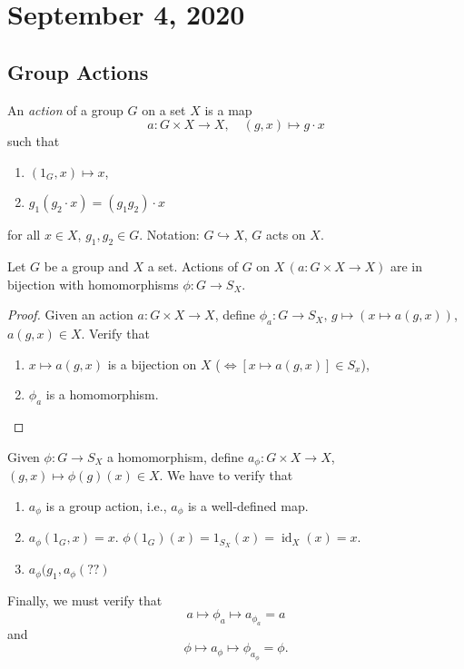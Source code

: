 \section{September 4, 2020}
\subsection{Group Actions}
\begin{definition}
    An \emph{action} of a group $G$ on a set $X$ is a map \[
        a \colon G \times X \to X, \quad (g,x) \mapsto g\cdot x
    \]
    such that 
    \begin{enumerate}
        \item $(1_G,x) \mapsto x$,
        \item $g_1(g_2\cdot x)=(g_1g_2)\cdot x$
    \end{enumerate}
    for all $x\in X$, $g_1,g_2\in G$. Notation: $G \hookrightarrow X$, $G$ acts on $X$.
\end{definition}
\begin{prop}
    Let $G$ be a group and $X$ a set. Actions of $G$ on $X \,(a \colon G\times X \to X)$ are in bijection with homomorphisms $\phi \colon G \to S_X$.
\end{prop}
\begin{proof}
    Given an action $a \colon G\times X \to X$, define $\phi_a \colon G \to S_X, \, g \mapsto (x \mapsto a(g,x))$, $a(g,x)\in X$. Verify that 
    \begin{enumerate}
        \item $x\mapsto a(g,x)$ is a bijection on $X$ ($\iff [x \mapsto a(g,x)]\in S_x$),
        \item $\phi_a$ is a homomorphism.
    \end{enumerate}
\end{proof}
Given $\phi \colon G \to S_X$ a homomorphism, define $a_{\phi} \colon G\times X \to X$, $(g,x) \mapsto \phi(g)(x) \in X$. We have to verify that 
\begin{enumerate}
    \item $a_{\phi}$ is a group action, i.e., $a_{\phi}$ is a well-defined map.
    \item $a_{\phi}(1_G,x)=x$. $\phi(1_G)(x)=1_{S_X}(x)=\operatorname{id}_X(x)=x$.

    \item $a_{\phi}(g_1,a_{\phi}(??)$
\end{enumerate}
Finally, we must verify that \[
a \mapsto \phi_a \mapsto a_{\phi_a}=a
\]
and \[
\phi \mapsto a_{\phi}\mapsto \phi_{a_{\phi}}=\phi.
\]

